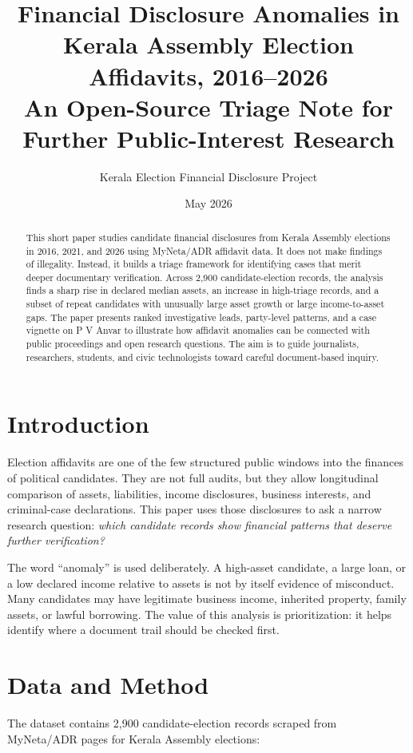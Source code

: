 \documentclass[11pt]{article}
\title{\textbf{Financial Disclosure Anomalies in Kerala Assembly Election Affidavits, 2016--2026}\\
\large An Open-Source Triage Note for Further Public-Interest Research}
\author{Kerala Election Financial Disclosure Project}
\date{May 2026}
\begin{document}
\maketitle

\begin{abstract}
This short paper studies candidate financial disclosures from Kerala Assembly elections in 2016, 2021, and 2026 using MyNeta/ADR affidavit data. It does not make findings of illegality. Instead, it builds a triage framework for identifying cases that merit deeper documentary verification. Across 2,900 candidate-election records, the analysis finds a sharp rise in declared median assets, an increase in high-triage records, and a subset of repeat candidates with unusually large asset growth or large income-to-asset gaps. The paper presents ranked investigative leads, party-level patterns, and a case vignette on P V Anvar to illustrate how affidavit anomalies can be connected with public proceedings and open research questions. The aim is to guide journalists, researchers, students, and civic technologists toward careful document-based inquiry.
\end{abstract}

\section{Introduction}

Election affidavits are one of the few structured public windows into the finances of political candidates. They are not full audits, but they allow longitudinal comparison of assets, liabilities, income disclosures, business interests, and criminal-case declarations. This paper uses those disclosures to ask a narrow research question: \emph{which candidate records show financial patterns that deserve further verification?}

The word ``anomaly'' is used deliberately. A high-asset candidate, a large loan, or a low declared income relative to assets is not by itself evidence of misconduct. Many candidates may have legitimate business income, inherited property, family assets, or lawful borrowing. The value of this analysis is prioritization: it helps identify where a document trail should be checked first.

\section{Data and Method}

The dataset contains 2,900 candidate-election records scraped from MyNeta/ADR pages for Kerala Assembly elections:
\end{document}
